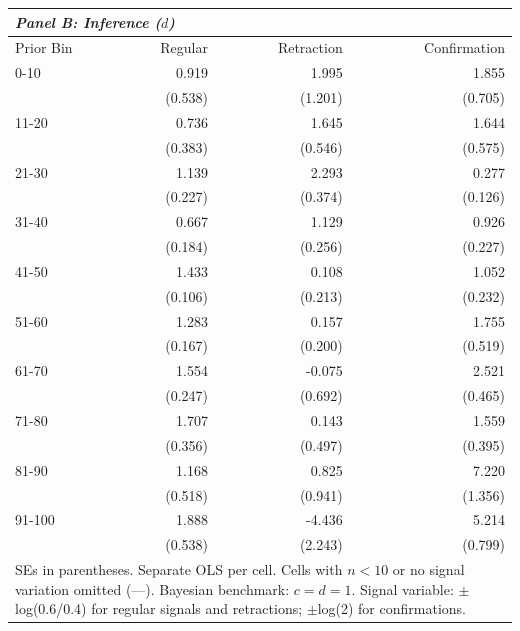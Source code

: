 \begin{table}[htbp]
\begin{tabular}{lrrr}
\multicolumn{4}{l}{\textit{Panel B: Inference ($d$)}} \\
\hline
Prior Bin & Regular & Retraction & Confirmation \\
\hline
0-10 & 0.919 & 1.995 & 1.855
 \\
 & (0.538) & (1.201) & (0.705)
 \\
11-20 & 0.736 & 1.645 & 1.644
 \\
 & (0.383) & (0.546) & (0.575)
 \\
21-30 & 1.139 & 2.293 & 0.277
 \\
 & (0.227) & (0.374) & (0.126)
 \\
31-40 & 0.667 & 1.129 & 0.926
 \\
 & (0.184) & (0.256) & (0.227)
 \\
41-50 & 1.433 & 0.108 & 1.052
 \\
 & (0.106) & (0.213) & (0.232)
 \\
51-60 & 1.283 & 0.157 & 1.755
 \\
 & (0.167) & (0.200) & (0.519)
 \\
61-70 & 1.554 & -0.075 & 2.521
 \\
 & (0.247) & (0.692) & (0.465)
 \\
71-80 & 1.707 & 0.143 & 1.559
 \\
 & (0.356) & (0.497) & (0.395)
 \\
81-90 & 1.168 & 0.825 & 7.220
 \\
 & (0.518) & (0.941) & (1.356)
 \\
91-100 & 1.888 & -4.436 & 5.214
 \\
 & (0.538) & (2.243) & (0.799)
 \\
\hline

\multicolumn{4}{p{0.85\textwidth}}{\small SEs in parentheses. Separate OLS per cell. Cells with $n<10$ or no signal variation omitted (---). Bayesian benchmark: $c=d=1$. Signal variable: $\pm$log(0.6/0.4) for regular signals and retractions; $\pm$log(2) for confirmations.} \\
\end{tabular}
\end{table}
